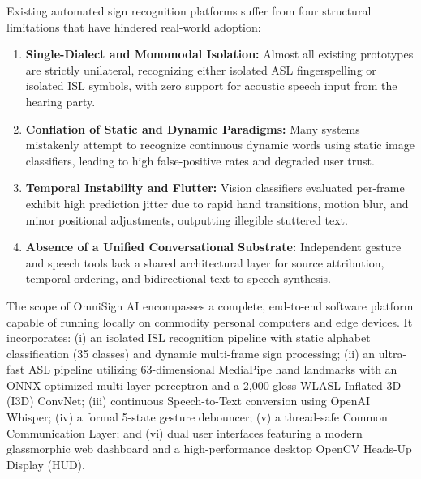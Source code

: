 \documentclass[12pt,a4paper]{report}
\begin{document}
Existing automated sign recognition platforms suffer from four structural limitations that have hindered real-world adoption:
\begin{enumerate}[label=(\roman*), noitemsep, topsep=2pt]
\item \textbf{Single-Dialect and Monomodal Isolation:} Almost all existing prototypes are strictly unilateral, recognizing either isolated ASL fingerspelling or isolated ISL symbols, with zero support for acoustic speech input from the hearing party.
\item \textbf{Conflation of Static and Dynamic Paradigms:} Many systems mistakenly attempt to recognize continuous dynamic words using static image classifiers, leading to high false-positive rates and degraded user trust.
\item \textbf{Temporal Instability and Flutter:} Vision classifiers evaluated per-frame exhibit high prediction jitter due to rapid hand transitions, motion blur, and minor positional adjustments, outputting illegible stuttered text.
\item \textbf{Absence of a Unified Conversational Substrate:} Independent gesture and speech tools lack a shared architectural layer for source attribution, temporal ordering, and bidirectional text-to-speech synthesis.
\end{enumerate}

The scope of OmniSign AI encompasses a complete, end-to-end software platform capable of running locally on commodity personal computers and edge devices. It incorporates: (i) an isolated ISL recognition pipeline with static alphabet classification (35 classes) and dynamic multi-frame sign processing; (ii) an ultra-fast ASL pipeline utilizing 63-dimensional MediaPipe hand landmarks with an ONNX-optimized multi-layer perceptron and a 2,000-gloss WLASL Inflated 3D (I3D) ConvNet; (iii) continuous Speech-to-Text conversion using OpenAI Whisper; (iv) a formal 5-state gesture debouncer; (v) a thread-safe Common Communication Layer; and (vi) dual user interfaces featuring a modern glassmorphic web dashboard and a high-performance desktop OpenCV Heads-Up Display (HUD).
\end{document}

